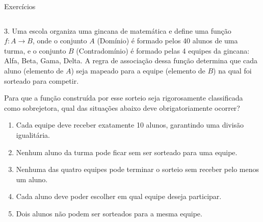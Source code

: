 \documentclass[aspectratio=169, t, 8pt]{beamer}
\begin{document}
    \begin{frame}{Exercícios}
        \begin{columns}[totalwidth=.9\textwidth]
           \begin{column}{\textwidth}
            3. Uma escola organiza uma gincana de matemática e define uma função $f: A \rightarrow B$, onde o conjunto $A$ (Domínio) é formado pelos 40 alunos de uma turma, e o conjunto $B$ (Contradomínio) é formado pelas 4 equipes da gincana: {Alfa, Beta, Gama, Delta}. A regra de associação dessa função determina que cada aluno (elemento de $A$) seja mapeado para a equipe (elemento de $B$) na qual foi sorteado para competir.
            
            \vspace{1em}

            Para que a função construída por esse sorteio seja rigorosamente classificada como sobrejetora, qual das situações abaixo deve obrigatoriamente ocorrer?

            \vspace{1.2em}

                \begin{enumerate}[label=\alph*)]
                    \item Cada equipe deve receber exatamente 10 alunos, garantindo uma divisão igualitária.
                    \item Nenhum aluno da turma pode ficar sem ser sorteado para uma equipe.
                    \item Nenhuma das quatro equipes pode terminar o sorteio sem receber pelo menos um aluno.
                    \item Cada aluno deve poder escolher em qual equipe deseja participar.
                    \item Dois alunos não podem ser sorteados para a mesma equipe.
                \end{enumerate}
           \end{column}
        \end{columns}        
    \end{frame}
\end{document}
